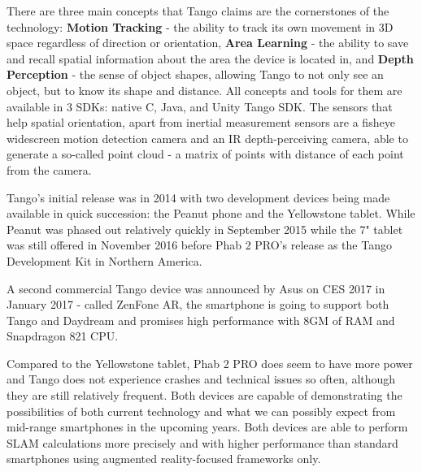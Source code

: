 \documentclass[12pt, a4paper]{article}
\begin{document}
There are three main concepts that Tango claims are the cornerstones of the technology: \textbf{Motion Tracking} - the ability to track its own movement in 3D space regardless of direction or orientation, \textbf{Area Learning} - the ability to save and recall spatial information about the area the device is located in, and \textbf{Depth Perception} - the sense of object shapes, allowing Tango to not only see an object, but to know its shape and distance. All concepts and tools for them are available in 3 SDKs: native C, Java, and Unity Tango SDK. The sensors that help spatial orientation, apart from inertial measurement sensors are a fisheye widescreen motion detection camera and an IR depth-perceiving camera, able to generate a so-called point cloud - a matrix of points with distance of each point from the camera.

Tango’s initial release was in 2014 with two development devices being made available in quick succession: the Peanut phone and the Yellowstone tablet. While Peanut was phased out relatively quickly in September 2015 while the 7" tablet was still offered in November 2016 before Phab 2 PRO’s release as the Tango Development Kit in Northern America.

A second commercial Tango device was announced by Asus on CES 2017 in January 2017 - called ZenFone AR, the smartphone is going to support both Tango and Daydream and promises high performance with 8GM of RAM and Snapdragon 821 CPU.

Compared to the Yellowstone tablet, Phab 2 PRO does seem to have more power and Tango does not experience crashes and technical issues so often, although they are still relatively frequent. Both devices are capable of demonstrating the possibilities of both current technology and what we can possibly expect from mid-range smartphones in the upcoming years. Both devices are able to perform SLAM calculations more precisely and with higher performance than standard smartphones using augmented reality-focused frameworks only.

\end{document}
